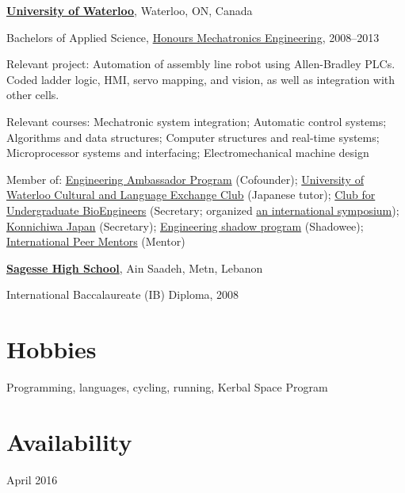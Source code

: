 \documentclass[10pt, a4paper]{article}
\begin{document}
\halfblankline

\href{https://www.uwaterloo.ca/}{\textbf{University of Waterloo}}, Waterloo, ON, Canada
\begin{outerlist}
\item[] Bachelors of Applied Science, \href{https://uwaterloo.ca/mechanical-mechatronics-engineering/program-overview}{Honours Mechatronics Engineering}, 2008--2013
  \begin{innerlist}
  \item Relevant project: Automation of assembly line robot using Allen-Bradley PLCs. Coded ladder logic, HMI, servo mapping, and vision, as well as integration with other cells.
  \item Relevant courses:
	  Mechatronic system integration;
	  Automatic control systems;
	  Algorithms and data structures;
	  Computer structures and real-time systems;
	  Microprocessor systems and interfacing;
	  Electromechanical machine design
  \item Member of:
	  \href{https://uwaterloo.ca/engineering-student-ambassadors/}{Engineering Ambassador Program} (Cofounder);
	  \href{http://uwclec.webs.com/}{University of Waterloo Cultural and Language Exchange Club} (Japanese tutor);
	  \href{http://cube.uwaterloo.ca/}{Club for Undergraduate BioEngineers} (Secretary; organized \href{http://cube.uwaterloo.ca/Symposium%202010%20web%20site/symp%202010.htm}{an international symposium});
	  \href{http://www.uwkonja.com/}{Konnichiwa Japan} (Secretary);
	  \href{https://uwaterloo.ca/engineering-student-ambassadors/shadow-program}{Engineering shadow program} (Shadowee);
	  \href{https://uwaterloo.ca/international-students/programs/international-peer-mentors}{International Peer Mentors} (Mentor)
  \end{innerlist}
\end{outerlist}

\halfblankline

\href{http://sagessehs.edu.lb/}{\textbf{Sagesse High School}}, Ain Saadeh, Metn, Lebanon
\begin{outerlist}
\item[] International Baccalaureate (IB) Diploma, 2008
\end{outerlist}

\section{Hobbies}
Programming, languages, cycling, running, Kerbal Space Program

\section{Availability}
April 2016
\end{document}
